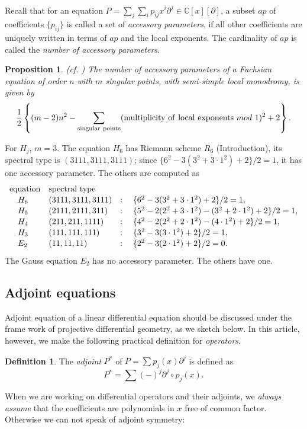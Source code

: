 \documentclass[a4paper,12pt]{article}
\newtheorem{prp}[thm]{Proposition}
\theoremstyle{definition}
\newtheorem{dfn}[thm]{Definition}
\theoremstyle{remark}
\numberwithin{equation}{section} %
\begin{document}
Recall that for an equation $P=\sum_j\sum_ip_{ij}x^i\partial^j \in\mathbb{C}[x][\partial]$, a subset $ap$ of coefficients $\{p_{ij}\}$ is called a set of {\it accessory parameters}, if all other coefficients are uniquely written in terms of $ap$ and the local exponents. The cardinality of $ap$ is called the {\it number of accessory parameters}.

\begin{prp}\label{numberofAP}{\rm(cf. \cite{Osh,Hara})}
  The number of accessory parameters of a Fuchsian equation of order $n$
  with $m$ singular points, with semi-simple local monodromy, is given by
  \[\frac12\left\{(m-2)n^2-\sum_{{\rm singular\ points}}({\rm multiplicity\ of\ local\ exponents}\ mod\ 1)^2+2\right\}.
  \]
\end{prp}
For $H_j$, $m=3$. The equation $H_6$ has Riemann scheme $R_6$ (Introduction), its spectral type is $(3111,3111,3111)$; since $\{6^2-3(3^2+3\cdot1^2)+2\}/2=1$, it has one accessory parameter. The others are computed as
  \[\def\arraystretch{1.1}
  \begin{array}{lll}
   {\rm equation}&{\rm spectral\ type}&\\ 
 \quad H_{6}\quad& (3111,3111,3111)&:\quad \{6^2-3(3^2+3\cdot1^2)+2\}/2=1,\\ 
 \quad H_{5}\quad& (2111,2111,311)&:\quad \{5^2-2(2^2+3\cdot1^2)-(3^2+2\cdot1^2)+2\}/2=1,\\ 
 \quad  H_{4}\quad& (211,211,1111)&:\quad\{4^2-2(2^2+2\cdot1^2)-(4\cdot1^2)+2\}/2=1,\\ 
 \quad H_{3}\quad& (111,111,111)&:\quad \{3^2-3(3\cdot1^2)+2\}/2=1,\\ 
\quad  E_2\quad& (11,11,11)&:\quad \{2^2-3(2\cdot1^2)+2\}/2=0.
  \end{array}\]
 The Gauss equation $E_2$ has no accessory parameter. The others have one.
  
   \subsection{Adjoint equations}\label{GenAdj}
Adjoint equation of a linear differential equation should be discussed under the frame work of projective differential geometry, as we sketch below. In this article, however, we make the following practical definition for {\it operators}. 

\begin{dfn}The {\sl adjoint} $P^*$ of $P=\sum p_j(x)\partial^j$ is defined as
  $$P^*=\sum (-)^j\partial^j\circ p_j(x).$$
\end{dfn}
When we are working on differential operators and their adjoints,
we {\it always assume} that the coefficients are polynomials in $x$
free of common factor. Otherwise we can not speak of adjoint symmetry:
\end{document}
